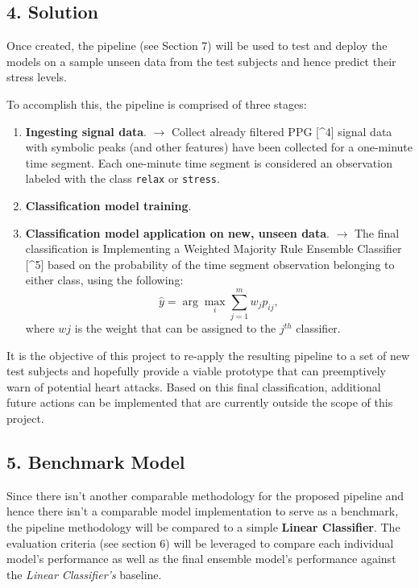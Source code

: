 \documentclass{scrreprt}
\begin{document}
\subsection{4. Solution}\label{solution}

Once created, the pipeline (see Section 7) will be used to test and
deploy the models on a sample unseen data from the test subjects and
hence predict their stress levels.

To accomplish this, the pipeline is comprised of three stages:

\begin{enumerate}
\def\labelenumi{\arabic{enumi}.}
\itemsep1pt\parskip0pt
\item
  \textbf{Ingesting signal data}. $\rightarrow$ Collect already filtered
  PPG {[}\^{}4{]} signal data with symbolic peaks (and other features)
  have been collected for a one-minute time segment. Each one-minute
  time segment is considered an observation labeled with the class
  \texttt{relax} or \texttt{stress}.
\item
  \textbf{Classification model training}.
\item
  \textbf{Classification model application on new, unseen data}.
  $\rightarrow$ The final classification is Implementing a Weighted
  Majority Rule Ensemble Classifier {[}\^{}5{]} based on the probability
  of the time segment observation belonging to either class, using the
  following: \[
  \hat{y} = \arg\max_{i}\sum^{m}_{j=1}w_{j}p_{ij},
  \] where $wj$ is the weight that can be assigned to the $j^{th}$
  classifier.
\end{enumerate}

It is the objective of this project to re-apply the resulting pipeline
to a set of new test subjects and hopefully provide a viable prototype
that can preemptively warn of potential heart attacks. Based on this
final classification, additional future actions can be implemented that
are currently outside the scope of this project.

\subsection{5. Benchmark Model}\label{benchmark-model}

Since there isn't another comparable methodology for the proposed
pipeline and hence there isn't a comparable model implementation to
serve as a benchmark, the pipeline methodology will be compared to a
simple \textbf{Linear Classifier}. The evaluation criteria (see section
6) will be leveraged to compare each individual model's performance as
well as the final ensemble model's performance against the \emph{Linear
Classifier's} baseline.
\end{document}
